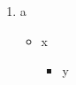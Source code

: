 \documentclass[11pt]{article}
\author{root}
\date{\today}
\title{}
\begin{document}
\tableofcontents

\begin{enumerate}
\item a
\begin{itemize}
\setcounter{enumi}{2}
\item x
\begin{itemize}
\setcounter{enumi}{3}
\item y
\end{itemize}
\end{itemize}
\end{enumerate}
\end{document}
